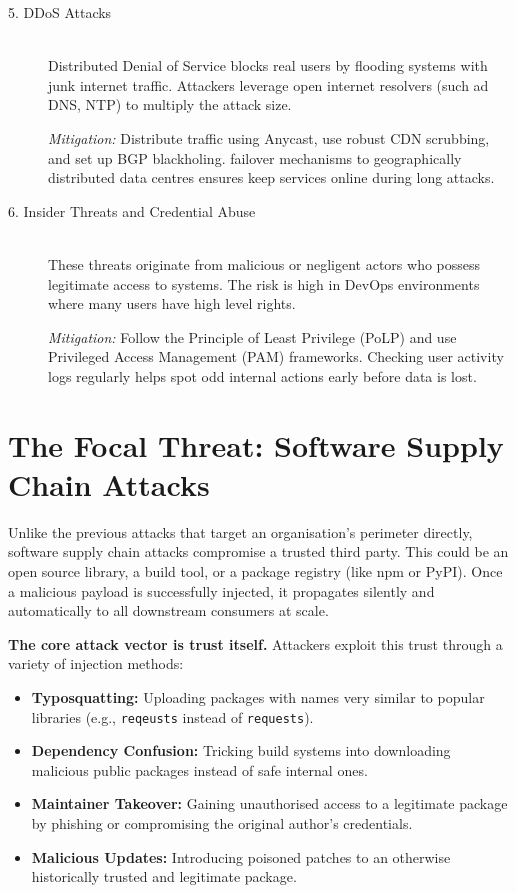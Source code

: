 \begin{description}
    \item[5. DDoS Attacks] \hfill \\
    Distributed Denial of Service blocks real users by flooding systems with junk internet traffic. Attackers leverage open internet resolvers (such ad DNS, NTP) to multiply the attack size.
    
    \textit{Mitigation:} Distribute traffic using Anycast, use robust CDN scrubbing, and set up BGP blackholing. failover mechanisms to geographically distributed data centres ensures keep services online during long attacks.

    \item[6. Insider Threats and Credential Abuse] \hfill \\
    These threats originate from malicious or negligent actors who possess legitimate access to systems. The risk is high in DevOps environments where many users have high level rights.
    
    \textit{Mitigation:} Follow the Principle of Least Privilege (PoLP) and use Privileged Access Management (PAM) frameworks. Checking user activity logs regularly helps spot odd internal actions early before data is lost.
\end{description}

\section{The Focal Threat: Software Supply Chain Attacks}

        \vspace{0pt}
        Unlike the previous attacks that target an organisation's perimeter directly, software supply chain attacks compromise a trusted third party. This could be an open source library, a build tool, or a package registry (like npm or PyPI). Once a malicious payload is successfully injected, it propagates silently and automatically to all downstream consumers at scale.

        \vspace{1em}
        \textbf{The core attack vector is trust itself.} Attackers exploit this trust through a variety of injection methods:
        \begin{itemize}
            \item \textbf{Typosquatting:} Uploading packages with names very similar to popular libraries (e.g., \texttt{reqeusts} instead of \texttt{requests}).
            \item \textbf{Dependency Confusion:} Tricking build systems into downloading malicious public packages instead of safe internal ones.
            \item \textbf{Maintainer Takeover:} Gaining unauthorised access to a legitimate package by phishing or compromising the original author's credentials.
            \item \textbf{Malicious Updates:} Introducing poisoned patches to an otherwise historically trusted and legitimate package.
        \end{itemize}
        
